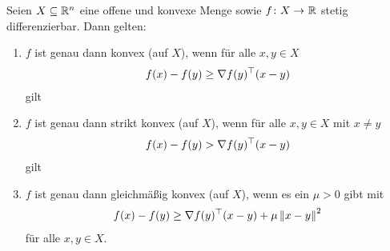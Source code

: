 \documentclass[ %
ngerman, %
a4paper, 
11pt,%
sectionreset, %
chapterstyle=framed, %
sectionstyle=pure, %
titlefont=osfamily %
]{../texmf/tex/latex/mathscriptMathTUD/mathscriptMathTUD}
\begin{document}

\begin{satz}
	Seien $X \subseteq \mathbb{R}^n$ eine offene und konvexe Menge sowie $\abb{f}{X}{\R}$ stetig differenzierbar. Dann gelten:
	\begin{enumerate}[leftmargin=*, label=(\roman*)]
		\item $f$ ist genau dann konvex (auf $X$), wenn für alle $x,y \in X$ 
		\begin{align} \label{eq: satz_konvex}
			f(x) - f(y) \geq \nabla f(y)^{\top} (x-y)
		\end{align}
		gilt
		\item $f$ ist genau dann strikt konvex (auf $X$), wenn für alle $x,y \in X$ mit $x \neq y$ 
		\begin{align} \label{eq: satz_streng_konvex}
		f(x) - f(y) > \nabla f(y)^{\top} (x-y)
		\end{align}
		gilt
		\item $f$ ist genau dann gleichmäßig konvex (auf $X$), wenn es ein $\mu > 0$ gibt mit
		\begin{align} \label{eq: satz_gleichmaessig_konvex}
		f(x) - f(y) \geq \nabla f(y)^{\top} (x-y) + \mu \left\lVert x-y \right\rVert^2
		\end{align}
		für alle $x,y \in X$.
	\end{enumerate}
\end{satz}
\end{document}
